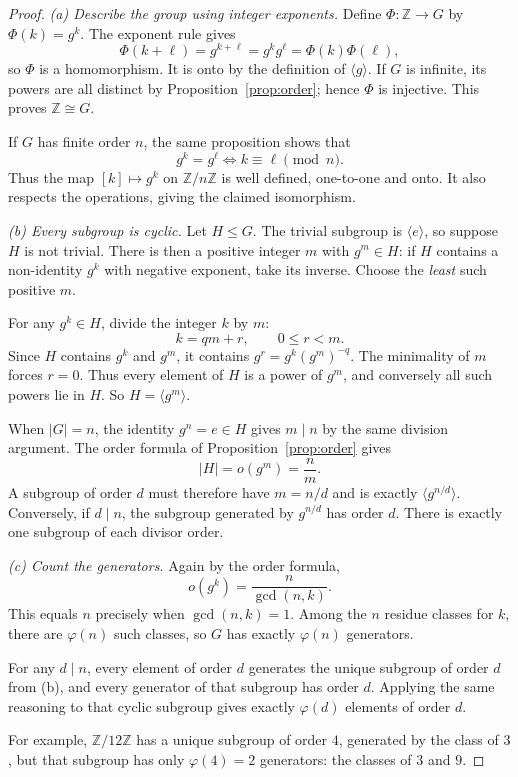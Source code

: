\begin{proof}
\emph{(a) Describe the group using integer exponents.}
Define $\Phi:\mathbb Z\to G$ by $\Phi(k)=g^k$.
The exponent rule gives
\[
\Phi(k+\ell)=g^{k+\ell}=g^kg^\ell
=\Phi(k)\Phi(\ell),
\]
so $\Phi$ is a homomorphism. It is onto by the
definition of $\langle g\rangle$.
If $G$ is infinite, its powers are all distinct by
Proposition~\ref{prop:order}; hence $\Phi$ is injective.
This proves $\mathbb Z\cong G$.

If $G$ has finite order $n$, the same proposition
shows that
\[
g^k=g^\ell\iff k\equiv\ell\pmod n.
\]
Thus the map $[k]\mapsto g^k$ on $\mathbb Z/n\mathbb Z$
is well defined, one-to-one and onto. It also
respects the operations, giving the claimed isomorphism.

\emph{(b) Every subgroup is cyclic.}
Let $H\le G$. The trivial subgroup is $\langle e\rangle$,
so suppose $H$ is not trivial. There is then a positive
integer $m$ with $g^m\in H$: if $H$ contains a non-identity
$g^k$ with negative exponent, take its inverse.
Choose the \emph{least} such positive $m$.

For any $g^k\in H$, divide the integer $k$ by $m$:
\[
k=qm+r,\qquad0\le r<m.
\]
Since $H$ contains $g^k$ and $g^m$, it contains
$g^r=g^k(g^m)^{-q}$. The minimality of $m$
forces $r=0$. Thus every element of $H$ is a power
of $g^m$, and conversely all such powers lie in $H$.
So $H=\langle g^m\rangle$.

When $|G|=n$, the identity $g^n=e\in H$ gives
$m\mid n$ by the same division argument. The order
formula of Proposition~\ref{prop:order} gives
\[
|H|=o(g^m)=\frac{n}{m}.
\]
A subgroup of order $d$ must therefore have
$m=n/d$ and is exactly $\langle g^{n/d}\rangle$.
Conversely, if $d\mid n$, the subgroup generated
by $g^{n/d}$ has order $d$. There is exactly
one subgroup of each divisor order.

\emph{(c) Count the generators.}
Again by the order formula,
\[
o(g^k)=\frac{n}{\gcd(n,k)}.
\]
This equals $n$ precisely when $\gcd(n,k)=1$.
Among the $n$ residue classes for $k$, there are
$\varphi(n)$ such classes, so $G$ has exactly
$\varphi(n)$ generators.

For any $d\mid n$, every element of order $d$
generates the unique subgroup of order $d$
from (b), and every generator of that subgroup
has order $d$. Applying the same reasoning to
that cyclic subgroup gives exactly $\varphi(d)$
elements of order $d$.

For example, $\mathbb Z/12\mathbb Z$ has a unique
subgroup of order $4$, generated by the class of $3$,
but that subgroup has only $\varphi(4)=2$ generators:
the classes of $3$ and $9$.
\end{proof}

